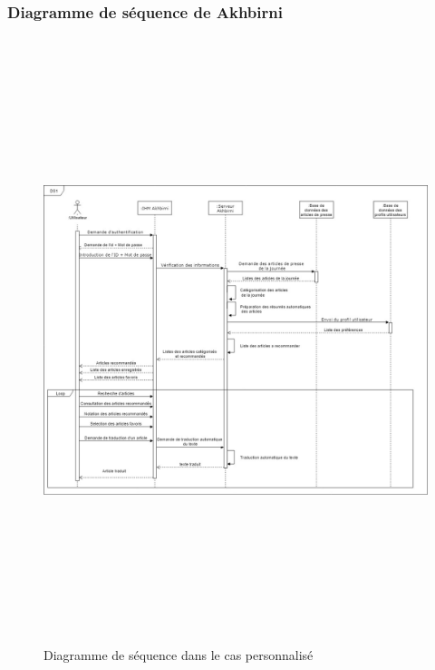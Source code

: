 \subsubsection{Diagramme de séquence de Akhbirni}
\begin{figure}[H]
	\centering
	\includegraphics[height=500pt,width=450pt]{img/chapter3/diag_seq_pers.jpg}
	\caption{Diagramme de séquence dans le cas personnalisé}
\end{figure}


